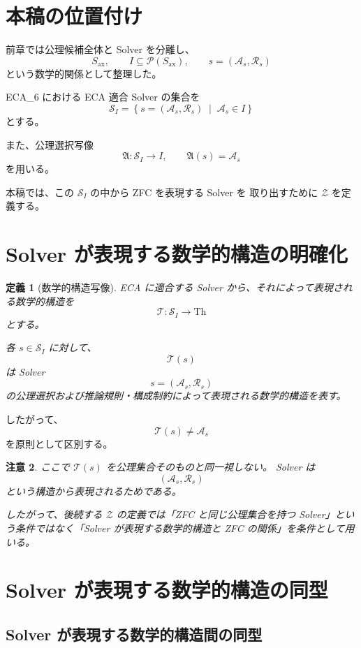 \documentclass[a4paper,11pt]{article}
\newtheorem{definition}{定義}[section]
\newtheorem{remark}[definition]{注意}
\newcommand{\Solver}{\mathcal{S}}
\newcommand{\Ax}{S_{\mathrm{ax}}}
\newcommand{\Th}{\mathrm{Th}}
\begin{document}
\section{本稿の位置付け}

前章では公理候補全体と Solver を分離し、
\[
\Ax,\qquad I\subseteq\mathcal{P}(\Ax),\qquad s=(\mathcal{A}_s,\mathcal{R}_s)
\]
という数学的関係として整理した。

ECA_6 における ECA 適合 Solver の集合を
\[
\Solver_I
=
\left\{
s=(\mathcal{A}_s,\mathcal{R}_s)
\;\middle|\;
\mathcal{A}_s\in I
\right\}
\]
とする。

また、公理選択写像
\[
\mathfrak{A}:\Solver_I\longrightarrow I,
\qquad
\mathfrak{A}(s)=\mathcal{A}_s
\]
を用いる。

本稿では、この $\Solver_I$ の中から ZFC を表現する Solver を
取り出すために $\mathcal{Z}$ を定義する。

\section{Solver が表現する数学的構造の明確化}

\begin{definition}[数学的構造写像]
ECA に適合する Solver から、それによって表現される数学的構造を
\[
\boxed{
\mathcal{T}:\Solver_I\longrightarrow\Th
}
\]
とする。

各 $s\in\Solver_I$ に対して、
\[
\mathcal{T}(s)
\]
は Solver
\[
s=(\mathcal{A}_s,\mathcal{R}_s)
\]
の公理選択および推論規則・構成制約によって表現される数学的構造を表す。
\end{definition}

したがって、
\[
\mathcal{T}(s)
\neq
\mathcal{A}_s
\]
を原則として区別する。

\begin{remark}
ここで $\mathcal{T}(s)$ を公理集合そのものと同一視しない。
Solver は
\[
(\mathcal{A}_s,\mathcal{R}_s)
\]
という構造から表現されるためである。

したがって、後続する $\mathcal{Z}$ の定義では「ZFC と同じ公理集合を持つ Solver」という条件ではなく「Solver が表現する数学的構造と ZFC の関係」を条件として用いる。
\end{remark}

\section{Solver が表現する数学的構造の同型}

\subsection{Solver が表現する数学的構造間の同型}
\end{document}
